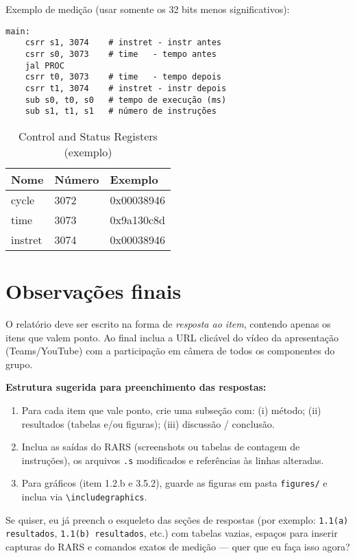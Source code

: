 \documentclass[12pt,a4paper]{article}
\begin{document}
Exemplo de medição (usar somente os 32 bits menos significativos):
\begin{verbatim}
main:
    csrr s1, 3074    # instret - instr antes
    csrr s0, 3073    # time   - tempo antes
    jal PROC
    csrr t0, 3073    # time   - tempo depois
    csrr t1, 3074    # instret - instr depois
    sub s0, t0, s0   # tempo de execução (ms)
    sub s1, t1, s1   # número de instruções
\end{verbatim}

\begin{table}[H]
\centering
\caption{Control and Status Registers (exemplo)}
\begin{tabular}{@{}lll@{}}
\toprule
Nome & Número & Exemplo \\ \midrule
cycle & 3072 & 0x00038946 \\
time & 3073 & 0x9a130c8d \\
instret & 3074 & 0x00038946 \\
\bottomrule
\end{tabular}
\end{table}

\section*{Observações finais}
O relatório deve ser escrito na forma de \emph{resposta ao item}, contendo apenas os itens que valem ponto. Ao final inclua a URL clicável do vídeo da apresentação (Teams/YouTube) com a participação em câmera de todos os componentes do grupo.

\bigskip
\noindent\textbf{Estrutura sugerida para preenchimento das respostas:}
\begin{enumerate}
    \item Para cada item que vale ponto, crie uma subseção com: (i) método; (ii) resultados (tabelas e/ou figuras); (iii) discussão / conclusão.
    \item Inclua as saídas do RARS (screenshots ou tabelas de contagem de instruções), os arquivos \texttt{.s} modificados e referências às linhas alteradas.
    \item Para gráficos (item 1.2.b e 3.5.2), guarde as figuras em pasta \texttt{figures/} e inclua via \verb|\includegraphics|.
\end{enumerate}

\bigskip
\noindent Se quiser, eu já preench o esqueleto das seções de respostas (por exemplo: \texttt{1.1(a) resultados}, \texttt{1.1(b) resultados}, etc.) com tabelas vazias, espaços para inserir capturas do RARS e comandos exatos de medição — quer que eu faça isso agora?
\end{document}
